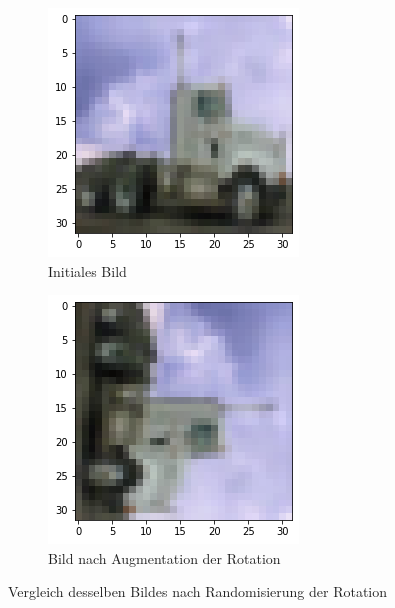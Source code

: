 \begin{figure}[htb]
	\begin{subfigure}[ht]{.5\textwidth}
		\includegraphics[width=\textwidth]{images/flip}
		\caption{Initiales Bild}
		\label{fig:rotate}
	\end{subfigure}\hfill%
	\begin{subfigure}[ht]{.5\textwidth}
		\includegraphics[width=\textwidth]{images/rotate_a}
		\caption{Bild nach Augmentation der Rotation}
		\label{fig:rotate_a}
	\end{subfigure}\hfill%
	\caption{Vergleich desselben Bildes nach Randomisierung der Rotation}
\end{figure}

